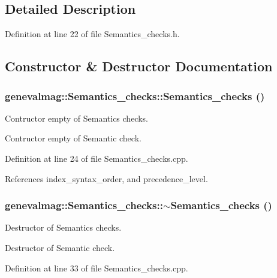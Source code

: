 \subsection{Detailed Description}


Definition at line 22 of file Semantics\_\-checks.h.



\subsection{Constructor \& Destructor Documentation}
\hypertarget{classgenevalmag_1_1Semantics__checks_a332b806015b2d142ebaaa5ec5f7f6078}{
\subsubsection[{Semantics\_\-checks}]{\setlength{\rightskip}{0pt plus 5cm}genevalmag::Semantics\_\-checks::Semantics\_\-checks ()}}
\label{classgenevalmag_1_1Semantics__checks_a332b806015b2d142ebaaa5ec5f7f6078}
Contructor empty of Semantics checks.

Contructor empty of Semantic check. 

Definition at line 24 of file Semantics\_\-checks.cpp.



References index\_\-syntax\_\-order, and precedence\_\-level.

\hypertarget{classgenevalmag_1_1Semantics__checks_a77ad2416d9844554db3602939a9f462c}{
\subsubsection[{$\sim$Semantics\_\-checks}]{\setlength{\rightskip}{0pt plus 5cm}genevalmag::Semantics\_\-checks::$\sim$Semantics\_\-checks ()}}
\label{classgenevalmag_1_1Semantics__checks_a77ad2416d9844554db3602939a9f462c}
Destructor of Semantics checks.

Destructor of Semantic check. 

Definition at line 33 of file Semantics\_\-checks.cpp.



